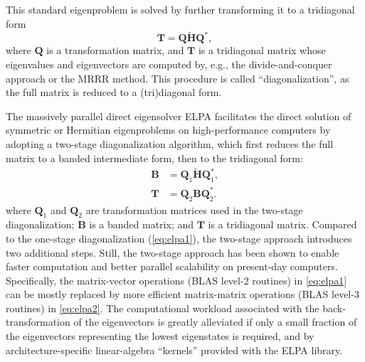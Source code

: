 \documentclass{report}
\begin{document}
This standard eigenproblem is solved by further transforming it to a tridiagonal form
\begin{equation}
\label{eq:elpa1}
\boldsymbol{T} = \boldsymbol{Q} \boldsymbol{\tilde{H}} \boldsymbol{Q}^* ,
\end{equation}
where $\boldsymbol{Q}$ is a transformation matrix, and $\boldsymbol{T}$ is a tridiagonal matrix whose eigenvalues and eigenvectors are computed by, e.g., the divide-and-conquer approach or the MRRR method.  This procedure is called ``diagonalization'', as the full matrix is reduced to a (tri)diagonal form.

The massively parallel direct eigensolver ELPA \cite{elpa_auckenthaler_2011,elpa_marek_2014} facilitates the direct solution of symmetric or Hermitian eigenproblems on high-performance computers by adopting a two-stage diagonalization algorithm, which first reduces the full matrix to a banded intermediate form, then to the tridiagonal form:
\begin{equation}
\label{eq:elpa2}
\begin{split}
\boldsymbol{B} & = \boldsymbol{Q}_1 \boldsymbol{\tilde{H}} \boldsymbol{Q}_1^* ,\\
\boldsymbol{T} & = \boldsymbol{Q}_2 \boldsymbol{B} \boldsymbol{Q}_2^* .
\end{split}
\end{equation}
where $\boldsymbol{Q}_1$ and $\boldsymbol{Q}_2$ are transformation matrices used in the two-stage diagonalization; $\boldsymbol{B}$ is a banded matrix; and $\boldsymbol{T}$ is a tridiagonal matrix.  Compared to the one-stage diagonalization (\ref{eq:elpa1}), the two-stage approach introduces two additional steps.  Still, the two-stage approach has been shown to enable faster computation and better parallel scalability on present-day computers.  Specifically, the matrix-vector operations (BLAS level-2 routines) in \ref{eq:elpa1} can be mostly replaced by more efficient matrix-matrix operations (BLAS level-3 routines) in \ref{eq:elpa2}.  The computational workload associated with the back-transformation of the eigenvectors is greatly alleviated if only a small fraction of the eigenvectors representing the lowest eigenstates is required, and by architecture-specific linear-algebra ``kernels'' provided with the ELPA library.
\end{document}
